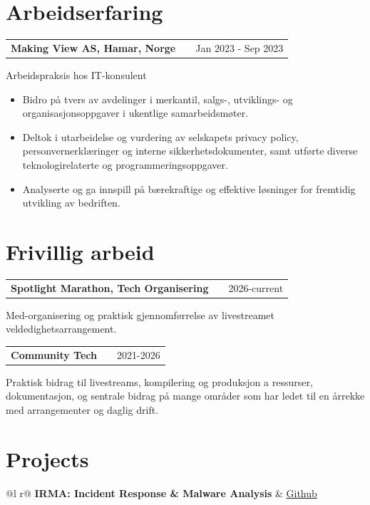 \documentclass[a4paper,12pt]{article}
\makeatletter
\newenvironment{jobshort}[2]
    {
    \begin{tabularx}{\linewidth}{@{}l X r@{}}
    \textbf{#1} & \hfill &  #2 \\[3.75pt]
    \end{tabularx}
    }
    {
    }
\makeatother
\begin{document}
\section{Arbeidserfaring}

\begin{jobshort}{Making View AS, Hamar, Norge}{Jan 2023 - Sep 2023}
Arbeidspraksis hos IT-konsulent
\begin{itemize}
    \item Bidro på tvers av avdelinger i merkantil, salgs-, utviklings- og organisasjonsoppgaver i ukentlige samarbeidsmøter. 
    \item Deltok i utarbeidelse og vurdering av selskapets privacy policy, personvernerklæringer og interne sikkerhetsdokumenter, samt utførte diverse teknologirelaterte og programmeringsoppgaver. 
    \item Analyserte og ga innspill på bærekraftige og effektive løsninger for fremtidig utvikling av bedriften. 
\end{itemize}
\end{jobshort}


\section{Frivillig arbeid}

\begin{jobshort}{Spotlight Marathon, Tech Organisering}{2026-current}
    Med-organisering og praktisk gjennomførrelse av livestreamet veldedighetsarrangement.
\end{jobshort}

\begin{jobshort}{Community Tech}{2021-2026}
    Praktisk bidrag til livestreams, kompilering og produksjon a ressurser, dokumentasjon, og sentrale bidrag på mange områder som har ledet til en årrekke med arrangementer og daglig drift.
\end{jobshort}

\section{Projects}

\begin{tabularx}{\linewidth}{ @{}l r@{} }
\textbf{IRMA: Incident Response \& Malware Analysis} & \hfill \href{https://github.com/cenyaae/bach-kmno}{Github} \\[3.75pt]
  \\
\end{tabularx}
\end{document}

